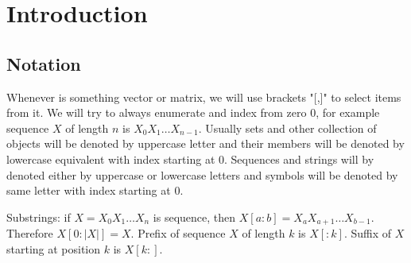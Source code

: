 \chapter{Introduction}

\section{Notation}

Whenever is something vector or matrix, we will use brackets "[,]" to select
items from it. We will try to always enumerate and index from zero 0, for
example sequence $X$ of length $n$ is $X_0X_1\dots X_{n-1}$. Usually sets and
other collection of objects will be denoted by uppercase letter and their
members will be denoted by lowercase equivalent  with index starting at 0.
Sequences and strings will by denoted either by uppercase or lowercase letters
and symbols will be denoted by same letter with index starting at 0.

Substrings: if $X=X_0X_1\dots X_n$ is sequence, then
$X\left[a:b\right]=X_aX_{a+1}\dots X_{b-1}$. Therefore $X[0:|X|]=X$. Prefix of
sequence $X$ of length $k$ is $X[:k]$. Suffix of $X$ starting at position $k$ is
$X[k:]$.


